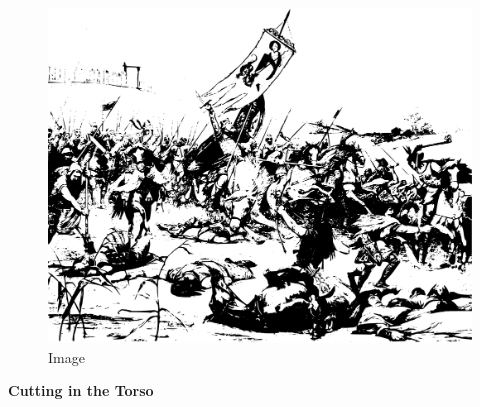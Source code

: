 \begin{figure}
\centering
\includegraphics{./images/combat06.pdf}
\caption{Image}
\end{figure}

\textbf{Cutting in the Torso}


